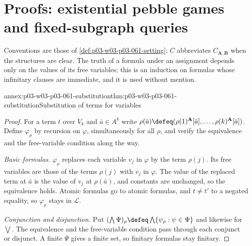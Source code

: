\section{Proofs: existential pebble games and fixed-subgraph queries}
\label{sec:annex-p03-w03-p03-061-existential}

Conventions are those of \cref{def:p03-w03-p03-061-setting}; \(C\) abbreviates
\(C_{\mathbf A,\mathbf B}\) when the structures are clear. The truth of a
formula under an assignment depends only on the values of its free variables;
this is an induction on formulas whose infinitary clauses are immediate, and
it is used without mention.

\begin{annexitem}{annex:p03-w03-p03-061-substitution}{thm:p03-w03-p03-061-substitution}{Substitution of terms for variables}
\begin{proof}
For a term \(t\) over \(V_k\) and \(\bar a\in A^k\) write
\(\rho(\bar a)\defeq(\rho(1)^{\mathbf A}[\bar a],\ldots,
\rho(k)^{\mathbf A}[\bar a])\). Define \(\varphi_\rho\) by recursion on
\(\varphi\), simultaneously for all \(\rho\), and verify the equivalence and
the free-variable condition along the way.

\emph{Basic formulas.} \(\varphi_\rho\) replaces each variable \(v_j\) in
\(\varphi\) by the term \(\rho(j)\). Its free variables are those of the terms
\(\rho(j)\) with \(v_j\) in \(\varphi\). The value of the replaced term at
\(\bar a\) is the value of \(v_j\) at \(\rho(\bar a)\), and constants are
unchanged, so the equivalence holds. Atomic formulas go to atomic formulas,
and \(t\neq t'\) to a negated equality, so \(\varphi_\rho\) stays in
\(\mathcal L\).

\emph{Conjunction and disjunction.} Put
\((\bigwedge\Psi)_\rho\defeq\bigwedge\{\psi_\rho:\psi\in\Psi\}\) and likewise
for \(\bigvee\). The equivalence and the free-variable condition pass through
each conjunct or disjunct. A finite \(\Psi\) gives a finite set, so finitary
formulas stay finitary.


\end{proof}
\end{annexitem}
